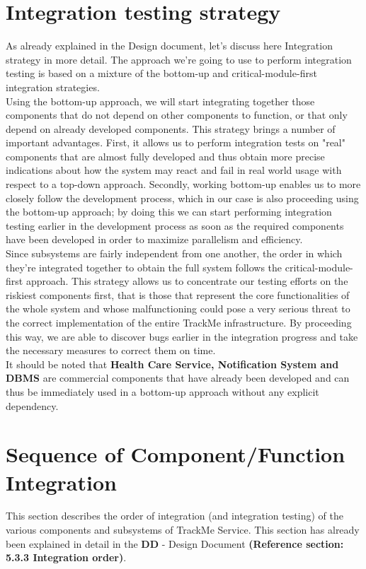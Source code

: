\documentclass[a4paper, hidelinks, 12pt]{report}
\begin{document}
	\section{Integration testing strategy}
	As already explained in the Design document, let's discuss here Integration strategy in more detail. The approach we're going to use to perform integration testing is based on a mixture of the bottom-up and critical-module-first integration strategies.\\
	
	Using the bottom-up approach, we will start integrating together those components that do not depend on other components to function, or that only depend on already developed components. This strategy brings a number of important advantages. First, it allows us to perform integration tests on "real" components that are almost fully developed and thus obtain more precise indications about how the system may react and fail in real world usage with respect to a top-down approach. Secondly, working bottom-up enables us to more closely follow the development process, which in our case is also proceeding using the bottom-up approach; by doing this we can start performing integration testing earlier in the development process as soon as the required components have been developed in order to maximize parallelism and efficiency.\\
	
	Since subsystems are fairly independent from one another, the order in which they're integrated together to obtain the full system follows the critical-module-first approach. This strategy allows us to concentrate our testing efforts on the riskiest components first, that is those that represent the core functionalities of the whole system and whose malfunctioning could pose a very serious threat to the correct implementation of the entire TrackMe infrastructure. By proceeding this way, we are able to discover bugs earlier in the integration progress and take the necessary measures to correct them on time.\\
	
	It should be noted that \textbf{Health Care Service, Notification System and DBMS} are commercial components that
have already been developed and can thus be immediately used in a bottom-up approach without any explicit dependency.
			
	\section{Sequence of Component/Function Integration}
	This section describes the order of integration (and integration testing) of the various components and subsystems of TrackMe Service. This section has already been explained in detail in the \textbf{DD} - Design Document \textbf{(Reference section: 5.3.3 Integration order)}.
			
\end{document}
